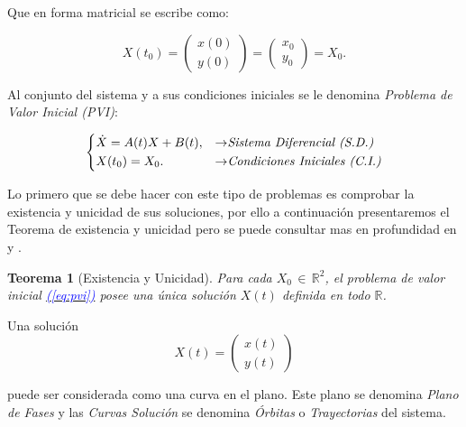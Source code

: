 \documentclass[12pt,a4paper]{report} %
\newtheorem{theorem}{Teorema}[chapter]
\newcommand{\eref}[1]{\hyperref[#1]{\textcolor{blue}{(\ref*{#1})}}}
\newcommand{\eref}[1]{\hyperref[#1]{\textcolor{blue}{\textit{(\ref*{#1})}}}}
\begin{document}
	\noindent Que en forma matricial se escribe como:
	
	\begin{equation}
		\label{cimat}
		X(t_0)=\begin{pmatrix}
			x(0)\\y(0)
		\end{pmatrix}=\begin{pmatrix}
		x_0\\y_0
		\end{pmatrix}=X_0.
	\end{equation}\smallskip
	
	\vspace{0.5cm}\noindent Al conjunto del sistema y a sus condiciones iniciales se le denomina \textit{Problema de Valor Inicial (PVI)}: 
	
	\begin{equation}
	\label{eq:pvi}
	\scalebox{1}{$\displaystyle
		\left\{
		\begin{aligned}
			&\dot{X}=A(t)X+B(t), &\rightarrow& \textit{Sistema Diferencial (S.D.)}\\
			&X(t_0)=X_0. &\rightarrow& \textit{Condiciones Iniciales (C.I.)}
		\end{aligned}
		\right.
		$}
    \end{equation}\smallskip
	
	\vspace{0.5cm} Lo primero que se debe hacer con este tipo de problemas es comprobar la existencia y unicidad de sus soluciones, por ello a continuación presentaremos el Teorema de existencia y unicidad pero se puede consultar mas en profundidad en \cite{perko} y \cite{simmons}.
	
	\begin{theorem}[Existencia y Unicidad]
		\label{thm:interesante}
		Para cada $X_0 \, \in \, \mathbb{R}^2$, el problema de valor inicial \eref{eq:pvi} posee una única solución $X(t)$ definida en todo $\mathbb{R}$.
	\end{theorem}
	\vspace{4mm}
	
	\noindent Una solución
	\begin{equation}
		\label{eq:puntos}
		X(t)=\begin{pmatrix}
			x(t) \\ y(t)
		\end{pmatrix}
	\end{equation}\smallskip
	
	\noindent puede ser considerada como una curva en el plano. Este plano se denomina \textit{Plano de Fases} y las \textit{Curvas Solución} se denomina \textit{Órbitas} o \textit{Trayectorias} del sistema.
	
\end{document}
